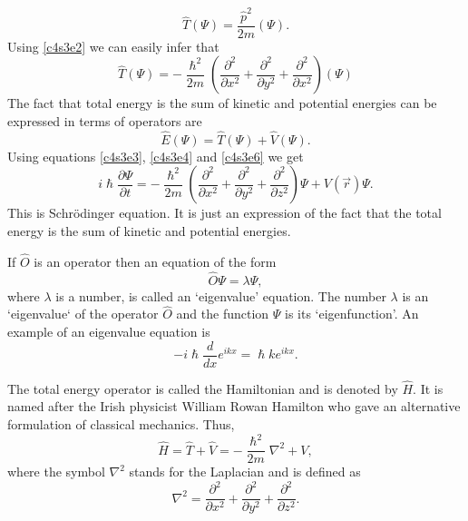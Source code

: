 \begin{equation}\label{c4s3e5}
\hat{T}(\Psi) = \frac{\hat{p}^2}{2m}(\Psi).
\end{equation}
Using \eqref{c4s3e2} we can easily infer that
\begin{equation}\label{c4s3e6}
\hat{T}(\Psi) = -\frac{\hslash^2}{2m}\left(\frac{\partial^2}{\partial x^2} 
+ \frac{\partial^2}{\partial y^2} + \frac{\partial^2}{\partial x^2}\right)
(\Psi)
\end{equation}
The fact that total energy is the sum of kinetic and potential energies can be
expressed in terms of operators are
\begin{equation}\label{c4s3e7}
\hat{E}(\Psi) = \hat{T}(\Psi) + \hat{V}(\Psi).
\end{equation}
Using equations \eqref{c4s3e3}, \eqref{c4s3e4} and \eqref{c4s3e6} we get
\begin{equation}\label{c4s3e8}
i\hslash\frac{\partial\Psi}{\partial t} = -\frac{\hslash^2}{2m}
\left(\frac{\partial^2}{\partial x^2} + \frac{\partial^2}{\partial y^2} +
 \frac{\partial^2}{\partial z^2}\right)\Psi + V(\vec{r})\Psi.
\end{equation} 
This is Schr\"{o}dinger equation. It is just an expression of the fact that the
total energy is the sum of kinetic and potential energies.

If $\hat{O}$ is an operator then an equation of the form
\begin{equation}\label{c4s3e9}
\hat{O}\Psi = \lambda\Psi,
\end{equation}
where $\lambda$ is a number, is called an `eigenvalue' equation. The number 
$\lambda$ is an `eigenvalue` of the operator $\hat{O}$ and the function $\Psi$
is its `eigenfunction'. An example of an eigenvalue equation is
\begin{equation}\label{c4s3e10}
-i\hslash \frac{d}{dx} e^{ikx} = \hslash k e^{ikx}.
\end{equation}

The total energy operator is called the Hamiltonian and is denoted by $\hat{H}$.
It is named after the Irish physicist William Rowan Hamilton who gave an 
alternative formulation of classical mechanics. Thus,
\begin{equation}\label{c4s3e11}
\hat{H} = \hat{T} + \hat{V} = -\frac{\hslash^2}{2m}\nabla^2 + V,
\end{equation}
where the symbol $\nabla^2$ stands for the Laplacian and is defined as
\begin{equation}\label{c4s3e12}
\nabla^2 = \frac{\partial^2}{\partial x^2} + 
\frac{\partial^2}{\partial y^2} +  \frac{\partial^2}{\partial z^2}.
\end{equation}

